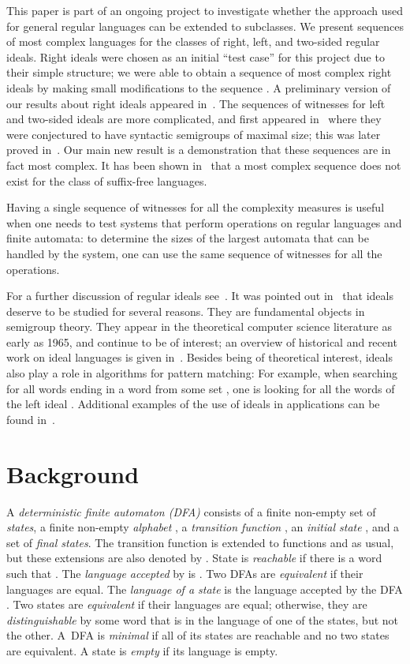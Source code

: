 \documentclass[final]{dmtcs-episciences}
\theoremstyle{definition}
\theoremstyle{remark}
\begin{document}
This paper is part of an ongoing project to investigate whether the approach used for general regular languages can be extended to subclasses. 
We present sequences of most complex languages for the classes of right, left, and two-sided regular  ideals. 
Right ideals were chosen as an initial ``test case'' for this project due to their simple structure; we were able to obtain a sequence of most complex right ideals by making small modifications to the sequence .
A preliminary version of our results about right ideals appeared in~\cite{BrDa14}. 
The sequences of witnesses for left and two-sided ideals are more complicated, and first appeared in~\cite{BrYe11} where they were conjectured to have syntactic semigroups of maximal size; this was later proved in~\cite{BSY15}.
Our main new result is a demonstration that these sequences are in fact most complex.
It has been shown in~\cite{BrSz15a} that a most complex sequence does not exist for the class of suffix-free languages.

Having a single sequence of witnesses for all the complexity measures is useful when one needs to test systems that perform operations on regular languages and finite automata: to determine the sizes of the largest automata that can be handled by the system, one can use the same sequence of witnesses for all the operations.

For a further discussion of regular ideals see~\cite{BrDa14,BJL13,BrSz14,BSY15,BrYe11}.
It was pointed out in~\cite{BJL13} that 
ideals deserve to be studied for several reasons. 
They are fundamental objects in semigroup theory. They appear in the theoretical computer science literature 
as early as 1965,
and continue to be of interest; an overview of historical and recent work on ideal languages is given in~\cite{BJL13}.
Besides being of theoretical interest, ideals also play a role in algorithms for pattern matching: 
For example, when searching for all words ending in a word from some set , one is looking for all the words of the left ideal .
Additional examples of the use of ideals in applications can be found in~\cite{AhCo75,CrHa90,CHL07,YCDLK06}. 

\section{Background}
\label{sec:background}

A \emph{deterministic finite automaton (DFA)}  consists of 
a finite non-empty set  of \emph{states},
a finite non-empty \emph{alphabet} ,  
a \emph{transition function} , an
\emph{initial state} , and 
a set  of \emph{final states}.
The transition function is extended to functions  and  as usual, but these extensions are  also denoted by . 
State   is \emph{reachable} if there is a word  such that . 
The \emph{language  accepted} by  is .
Two DFAs are \emph{equivalent} if their languages are equal.
The \emph{language of a state}  is the language accepted by the DFA 
.
Two states are \emph{equivalent} if their languages are equal; otherwise, they are \emph{distinguishable} by some word that is in the language of one of the states, but not the other. 
A~DFA is \emph{minimal} if all of its states are reachable and no two states are equivalent.
A state is \emph{empty} if its language is empty.
\end{document}
